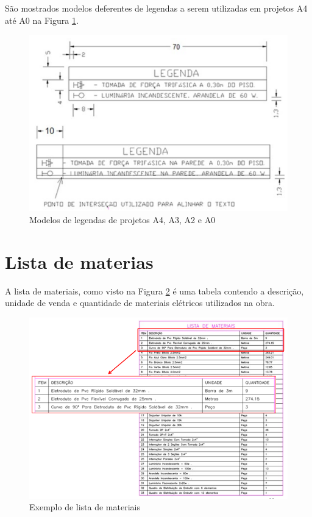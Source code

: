 \documentclass{article}
\begin{document}
\hspace{1cm} São mostrados modelos deferentes de legendas a serem utilizadas em projetos A4 até A0 na Figura \ref{fig_ModelosLegendaA4ateA0}.

\begin{figure} [H] %
\centering
\includegraphics[scale=0.7]{Fig/Figura_ModelosDeLegendasA4ateA0.png} 
\caption{Modelos de legendas de projetos A4, A3, A2 e A0}
\label{fig_ModelosLegendaA4ateA0}
\end{figure}

\section{Lista de materias}

\hspace{1cm} A lista de materiais, como visto na Figura \ref{fig_ListaMateriais} é uma tabela contendo a descrição, unidade de venda e quantidade de materiais elétricos utilizados na obra.

\begin{figure} [H] %
\centering
\includegraphics[scale=0.65]{Fig/Figura_ListaDeMateriais.png} 
\caption{Exemplo de lista de materiais}
\label{fig_ListaMateriais}
\end{figure}

\vspace{3.5cm}


\end{document}
